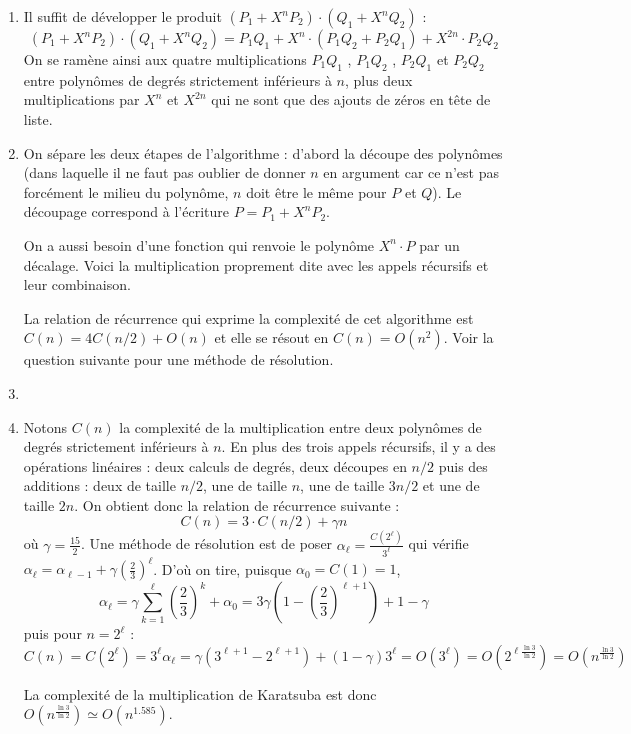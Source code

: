 \documentclass[class=report,crop=false]{standalone}
\begin{document}
\begin{enumerate}
  \item Il suffit de développer le produit $(P_1 + X^n P_2 ) \cdot (Q_1 + X^n Q_2 )$ :
$$(P_1 + X^n P_2 ) \cdot (Q_1 + X^n Q_2 ) = P_1 Q_1 + X^n \cdot (P_1 Q_2 + P_2 Q_1 ) + X^{2n} \cdot P_2 Q_2$$
On se ramène ainsi aux quatre multiplications $P_1 Q_1$ , $P_1 Q_2$ , $P_2 Q_1$ et $P_2 Q_2$
entre polynômes de degrés strictement inférieurs à $n$, plus
deux multiplications par $X^n$ et $X^{2n}$ qui ne sont que des ajouts de zéros en tête de liste.

  \item On sépare les deux étapes de l’algorithme : d’abord la découpe des polynômes
  (dans laquelle il ne faut pas oublier de donner $n$ en argument car ce n’est pas forcément
  le milieu du polynôme, $n$ doit être le même pour $P$ et $Q$). Le découpage 
  correspond à l'écriture $P=P_1+X^n P_2$.

 On a aussi besoin d'une fonction  qui renvoie
 le polynôme $X^n \cdot P$ par un décalage.
 Voici la multiplication proprement dite avec les appels récursifs et leur combinaison.




 La relation de récurrence qui exprime la complexité de cet algorithme est $C(n) = 4C(n/2)+O(n)$ et elle se résout en
 $C(n) = O(n^2)$. Voir la question suivante pour une méthode de résolution.


  \item \  

  \item Notons $C(n)$ la complexité de la multiplication entre deux polynômes de degrés strictement inférieurs à $n$.
  En plus des trois appels récursifs, il y a des opérations linéaires : deux calculs de degrés, deux découpes en $n/2$ puis des additions :
  deux de taille $n/2$, une de taille $n$,
une de taille $3n/2$ et une de taille $2n$. On obtient donc la relation de récurrence suivante :
$$C(n) = 3 \cdot C(n/2) + \gamma n$$
où $\gamma = \frac{15}{2}$.
Une méthode de résolution est de poser $\alpha_\ell= \frac{C(2^\ell)}{3^\ell}$ qui vérifie
$\alpha_\ell = \alpha_{\ell-1} + \gamma \left( \frac23  \right)^\ell$.
D’où on tire, puisque $\alpha_0 = C(1)=1$,
$$\alpha_\ell = \gamma \sum_{k=1}^\ell \left( \frac23  \right)^{k}+\alpha_0
= 3\gamma\left( 1 -  \left( \frac23  \right)^{\ell+1} \right)+1-\gamma$$
puis pour $n=2^\ell$ :
$$C(n)=C(2^\ell)=3^\ell \alpha_\ell=\gamma(3^{\ell+1}-2^{\ell+1}) +(1-\gamma)3^\ell = O(3^\ell) = O(2^{\ell \frac{\ln 3}{\ln 2}}) = O(n^\frac{\ln 3}{\ln 2})$$

La complexité de la multiplication de Karatsuba est donc $O(n^\frac{\ln 3}{\ln 2}) \simeq O(n^{1.585})$.
\end{enumerate}
\end{document}
